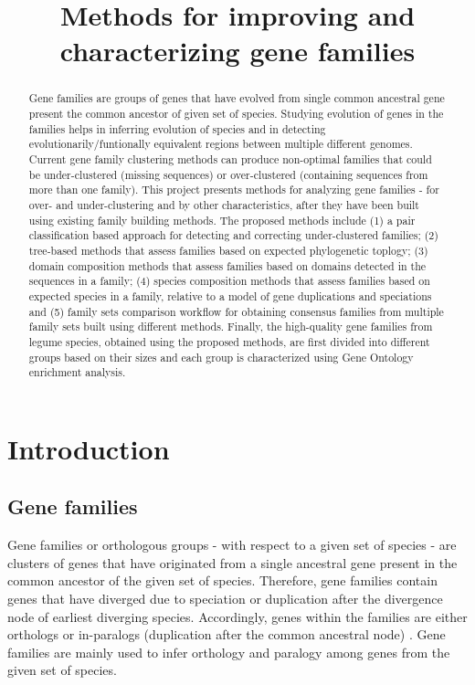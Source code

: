 \documentclass{article}
\date{}
\begin{document}
	\title{Methods for improving and characterizing gene families}
	\maketitle
	\tableofcontents
	\begin{abstract}
	Gene families are groups of genes that have evolved from single common ancestral gene present the common ancestor of given set of species. Studying evolution of genes in the families helps in inferring evolution of species and in detecting evolutionarily/funtionally equivalent regions between multiple different genomes. Current gene family clustering methods can produce non-optimal families that could be under-clustered (missing sequences) or over-clustered (containing sequences from more than one family). This project presents methods for analyzing gene families - for over- and under-clustering and by other characteristics, after they have been built using existing family building methods. The proposed methods include (1) a pair classification based approach for detecting and correcting under-clustered families; (2) tree-based methods that assess families based on expected phylogenetic toplogy; (3) domain composition methods that assess families based on domains detected in the sequences in a family; (4) species composition methods that assess families based on expected species in a family, relative to a model of gene duplications and speciations and (5) family sets comparison workflow for obtaining consensus families from multiple family sets built using different methods. Finally, the high-quality gene families from legume species, obtained using the proposed methods, are first divided into different groups based on their sizes and each group is characterized using Gene Ontology enrichment analysis.  
	\end{abstract}
	
	\section{Introduction}
		\subsection{Gene families}
		Gene families or orthologous groups - with respect to a given set of species - are clusters of genes that have originated from a single ancestral gene present in the common ancestor of the given set of species. Therefore, gene families contain genes that have diverged due to speciation or duplication after the divergence node of earliest diverging species. Accordingly, genes within the families are either orthologs or in-paralogs (duplication after the common ancestral node) \citep{fitch1970distinguishing,fitch2000homology, sonnhammer2002orthology}. Gene families are mainly used to infer orthology and paralogy among genes from the given set of species.
		
\end{document}
